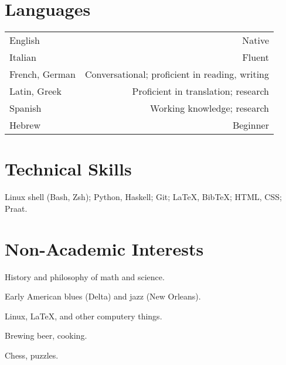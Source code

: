 \documentclass[11pt,letterpaper,twoside]{article}
\makeatletter
\newenvironment{cvsection}{%
  \renewcommand{\arraystretch}{1.75}
  \begin{longtable}[l]{@{} L R @{}}
}{%
  \end{longtable}
}
\makeatother
\begin{document}
\section*{Languages}

\begin{cvsection}
  English & Native\\
  Italian & Fluent\\
  French, German & Conversational; proficient in reading, writing\\
  Latin, Greek & Proficient in translation; research\\
  Spanish & Working knowledge; research\\
  Hebrew & Beginner\\
\end{cvsection}

\section*{Technical Skills}

Linux shell (Bash, Zsh); Python, Haskell; Git; \LaTeX, Bib\TeX; HTML, CSS; Praat.

\section*{Non-Academic Interests}

\begin{list}{}{\leftmargin=0pt}
  \item History and philosophy of math and science.
  \item Early American blues (Delta) and jazz (New Orleans).
  \item Linux, \LaTeX{}, and other computery things.
  \item Brewing beer, cooking.
  \item Chess, puzzles.
\end{list}
\end{document}
